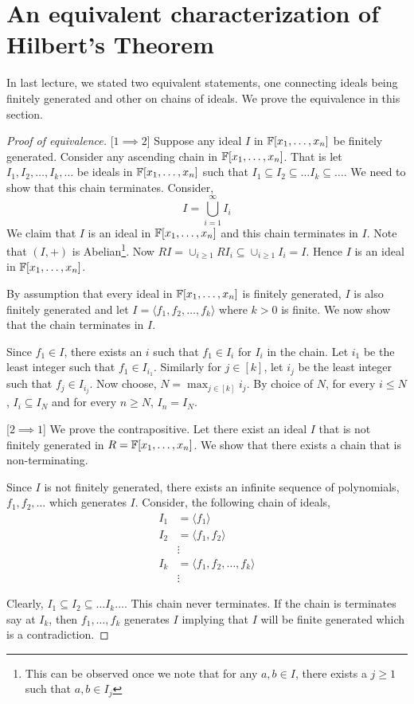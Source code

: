 \section{An equivalent characterization of Hilbert's Theorem}
In last lecture, we stated two equivalent statements, one connecting ideals
being finitely generated and other on chains of ideals. We prove
the equivalence in this section.

\begin{proof}[Proof of equivalence]	%
	[$1 \implies 2$] Suppose any ideal $I$ in ${\mathbb{F}}[x_1,\ldots,x_n]$ be
	finitely generated. Consider any ascending chain in
	${\mathbb{F}}[x_1,\ldots,x_n]$. That is let $I_1,I_2,\ldots,I_k,\ldots$ be
	ideals in ${\mathbb{F}}[x_1,\ldots,x_n]$ such that $I_1 \subseteq I_2 \subseteq
	\ldots I_k \subseteq \ldots$. We need to show that this chain
	terminates.  Consider, $$ I = \bigcup_{i=1}^{\infty}I_i$$ We claim
	that $I$ is an ideal in ${\mathbb{F}}[x_1,\ldots,x_n]$ and this chain terminates
	in $I$. Note that $(I,+)$ is Abelian\footnote{This can be observed
	once we note that for any $a,b \in I$, there exists a $j\ge 1$ such that
	$a,b \in I_j$}. Now $RI = \cup_{i \ge 1} RI_i \subseteq \cup_{i \ge 1}
	I_i = I$. Hence $I$ is an ideal in ${\mathbb{F}}[x_1,\ldots,x_n]$. 
	
	By assumption that every ideal in ${\mathbb{F}}[x_1,\ldots,x_n]$ is finitely
	generated, $I$ is also finitely	generated and let $I =  \langle 
	f_1,f_2,\ldots,f_k \rangle$ where $k>0$ is finite. We now show that
	the chain terminates in $I$.

	Since $f_1 \in I$, there exists an $i$ such that $f_1\in I_i$ for
	$I_i$ in the chain. Let $i_1$ be the least integer such that $f_1
	\in I_{i_1}$. Similarly for $j \in [k]$, let $i_j$ be the least
	integer such that $f_j \in I_{i_j}$. Now choose, $N = \max_{j \in [k]}
	i_j$.  By choice of $N$, for every $i \le N$, $I_i \subseteq I_N$ and
	for every $n \ge N$, $I_n = I_N$.
	
	[$2 \implies 1$] We prove the contrapositive. Let there exist an ideal 
	$I$ that is not finitely generated in $R = {\mathbb{F}}[x_1,\ldots,x_n]$. We
	show that there exists a chain that is non-terminating. 

	Since $I$ is not finitely generated, there exists an infinite sequence 
	of polynomials, $f_1,f_2,\ldots$ which generates $I$.
	Consider, the following chain of ideals, 
	\begin{align*}
	I_1 &= \langle f_1 \rangle \\
	I_2& =\langle f_1,f_2 \rangle \\ 
	& \vdots \\
	I_k & = \langle f_1,f_2, \ldots, f_k \rangle  \\
	& \vdots 
	\end{align*}

	Clearly, $I_1\subseteq I_2\subseteq \ldots I_k \ldots$. This chain
	never terminates. If the chain
	is terminates say at $I_k$, then $f_1,\ldots,f_k$ generates $I$ 
	implying that $I$ will be finite generated which is a contradiction. 
\end{proof}


